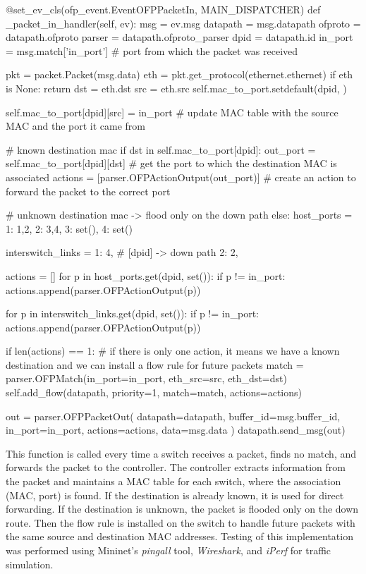 \vspace{.3cm}
\begin{pythoncode}
@set_ev_cls(ofp_event.EventOFPPacketIn, MAIN_DISPATCHER)
def _packet_in_handler(self, ev):
    msg = ev.msg
    datapath = msg.datapath
    ofproto = datapath.ofproto
    parser = datapath.ofproto_parser
    dpid = datapath.id
    in_port = msg.match['in_port'] # port from which the packet was received

    pkt = packet.Packet(msg.data)
    eth = pkt.get_protocol(ethernet.ethernet)
    if eth is None:
        return
    dst = eth.dst
    src = eth.src
    self.mac_to_port.setdefault(dpid, {})

    self.mac_to_port[dpid][src] = in_port # update MAC table with the source MAC and the port it came from

    # known destination mac 
    if dst in self.mac_to_port[dpid]: 
        out_port = self.mac_to_port[dpid][dst] # get the port to which the destination MAC is associated
        actions = [parser.OFPActionOutput(out_port)] # create an action to forward the packet to the correct port

    # unknown destination mac -> flood only on the down path
    else:
        host_ports = {
            1: {1,2}, 
            2: {3,4}, 
            3: set(), 
            4: set() 
        }

        interswitch_links = {
            1: {4}, # [dpid] -> down path 
            2: {2},
        }

        actions = []
        for p in host_ports.get(dpid, set()):
            if p != in_port:
                actions.append(parser.OFPActionOutput(p))

        for p in interswitch_links.get(dpid, set()):
            if p != in_port:
                actions.append(parser.OFPActionOutput(p))

    if len(actions) == 1: # if there is only one action, it means we have a known destination and we can install a flow rule for future packets
        match = parser.OFPMatch(in_port=in_port, eth_src=src, eth_dst=dst)
        self.add_flow(datapath, priority=1, match=match, actions=actions)

    out = parser.OFPPacketOut(
        datapath=datapath,
        buffer_id=msg.buffer_id,
        in_port=in_port,
        actions=actions,
        data=msg.data
    )
    datapath.send_msg(out)
\end{pythoncode}

\noindent 
This function is called every time a switch receives a packet, finds no match, and forwards the packet to the controller.
The controller extracts information from the packet and maintains a MAC table for each switch, where the association (MAC, port) is found.
If the destination is already known, it is used for direct forwarding. If the destination is unknown, the packet is flooded only on the down route.
Then the flow rule is installed on the switch to handle future packets with the same source and destination MAC addresses.
Testing of this implementation was performed using Mininet's \textit{pingall} tool, \textit{Wireshark}, and \textit{iPerf} for traffic simulation.

